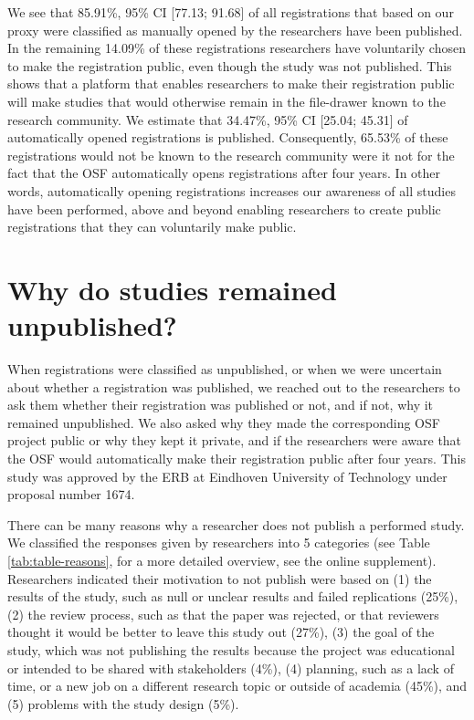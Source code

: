 \documentclass[
  ,jou, a4paper,floatsintext]{apa6}
\begin{document}
We see that 85.91\%, 95\% CI {[}77.13; 91.68{]} of all registrations that based on our proxy were classified as manually opened by the researchers have been published. In the remaining 14.09\% of these registrations researchers have voluntarily chosen to make the registration public, even though the study was not published. This shows that a platform that enables researchers to make their registration public will make studies that would otherwise remain in the file-drawer known to the research community. We estimate that 34.47\%, 95\% CI {[}25.04; 45.31{]} of automatically opened registrations is published. Consequently, 65.53\% of these registrations would not be known to the research community were it not for the fact that the OSF automatically opens registrations after four years. In other words, automatically opening registrations increases our awareness of all studies have been performed, above and beyond enabling researchers to create public registrations that they can voluntarily make public.

\hypertarget{why-do-studies-remained-unpublished}{%
\section{Why do studies remained unpublished?}\label{why-do-studies-remained-unpublished}}

When registrations were classified as unpublished, or when we were uncertain about whether a registration was published, we reached out to the researchers to ask them whether their registration was published or not, and if not, why it remained unpublished. We also asked why they made the corresponding OSF project public or why they kept it private, and if the researchers were aware that the OSF would automatically make their registration public after four years. This study was approved by the ERB at Eindhoven University of Technology under proposal number 1674.

There can be many reasons why a researcher does not publish a performed study. We classified the responses given by researchers into 5 categories (see Table \ref{tab:table-reasons}, for a more detailed overview, see the online supplement). Researchers indicated their motivation to not publish were based on (1) the results of the study, such as null or unclear results and failed replications (25\%), (2) the review process, such as that the paper was rejected, or that reviewers thought it would be better to leave this study out (27\%), (3) the goal of the study, which was not publishing the results because the project was educational or intended to be shared with stakeholders (4\%), (4) planning, such as a lack of time, or a new job on a different research topic or outside of academia (45\%), and (5) problems with the study design (5\%).
\end{document}
